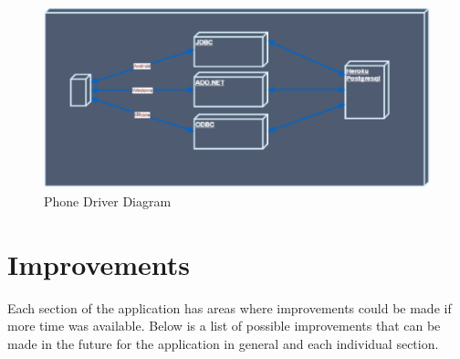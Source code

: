 \begin{figure}[h]
	\includegraphics{img/connection-diagram.png}
	\caption{Phone Driver Diagram}
\end{figure}

\pagebreak\section{Improvements}
Each section of the application has areas where improvements could be made if more time was available. Below is a list of possible improvements that can be made in the future for the application in general and each individual section. 
